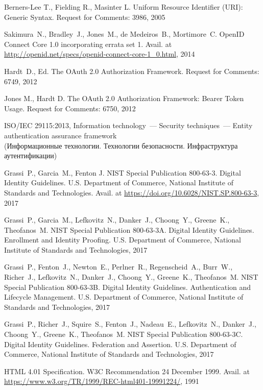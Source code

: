 \clearpage
\begin{thebibliography}{99}

Berners-Lee T., Fielding R., Masinter L. 
Uniform Resource Identifier (URI): Generic Syntax.
Request for Comments: 3986, 2005

Sakimura~N., Bradley~J., Jones~M., de Medeiros~B., Mortimore~C. 
OpenID Connect Core 1.0 incorporating errata set 1.
Avail. at \url{http://openid.net/specs/openid-connect-core-1_0.html}, 2014

Hardt~D., Ed.
The OAuth 2.0 Authorization Framework.
Request for Comments: 6749, 2012

Jones M., Hardt D.
The OAuth 2.0 Authorization Framework: Bearer Token Usage.
Request for Comments: 6750, 2012

ISO/IEC 29115:2013, Information technology~---
Security techniques~--– Entity authentication assurance framework\\
{\small (Информационные технологии. Технологии безопасности. Инфраструктура 
аутентификации)}

Grassi~P., Garcia~M., Fenton J.
NIST Special Publication 800-63-3. Digital Identity Guidelines.
U.S. Department of Commerce, National Institute of Standards and Technologies. 
Avail. at \url{https://doi.org/10.6028/NIST.SP.800-63-3}, 2017

Grassi~P., Garcia~M., 
Lefkovitz~N., Danker~J., 
Choong~Y., Greene~K., Theofanos~M. 
NIST Special Publication 800-63-3A. Digital Identity Guidelines. Enrollment and 
Identity Proofing.
U.S. Department of Commerce, National Institute of Standards and Technologies, 
2017

Grassi~P., Fenton~J., Newton~E., Perlner~R., Regenscheid~A., Burr~W., Richer~J., 
Lefkovitz~N., Danker~J., 
Choong~Y., Greene~K., Theofanos~M. 
NIST Special Publication 800-63-3B. Digital Identity Guidelines. 
Authentication and Lifecycle Management.
U.S. Department of Commerce, National Institute of Standards and Technologies, 
2017

Grassi~P., Richer~J., Squire~S., Fenton~J., Nadeau~E., 
Lefkovitz~N., Danker~J., 
Choong~Y., Greene~K., Theofanos~M.
NIST Special Publication 800-63-3C. Digital Identity Guidelines. 
Federation and Assertion.
U.S. Department of Commerce, National Institute of Standards and Technologies, 
2017 

HTML 4.01 Specification. 
W3C Recommendation 24 December 1999.
Avail. at \url{https://www.w3.org/TR/1999/REC-html401-19991224/}, 1991


\end{thebibliography}
